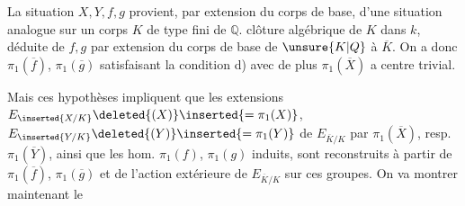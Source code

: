 
La situation $X,Y,f,g$ provient, par extension du corps de base, d'une situation analogue sur un corps $K$  de type fini de $\mathbb Q$.   clôture algébrique  de $K$ dans $k$,   déduite de  $f,g$ par extension du corps de base de $\unsure{K|Q}$ à $\overline K$. On a donc $\pi_1(\overline f)$, $\pi_1(\overline g)$ satisfaisant la condition d) avec de plus $\pi_1(\overline X)$ a centre trivial.

Mais ces hypothèses impliquent que les extensions $E_{\inserted{X/K}}\deleted{(X)}\inserted{=\pi_1(X)}$, $E_{\inserted{Y/K}}\deleted{(Y)}\inserted{=\pi_1(Y)}$ de $E_{\overline K/K}$ par $\pi_1(\overline X)$, resp. $\pi_1(\overline Y)$, ainsi que les hom. $\pi_1(f)$, $\pi_1(g)$ induits, sont reconstruits à partir de  $\pi_1(\overline f)$, $\pi_1(\overline g)$ et de l'action extérieure de $E_{\overline K/K}$ sur ces groupes. On va montrer maintenant le
